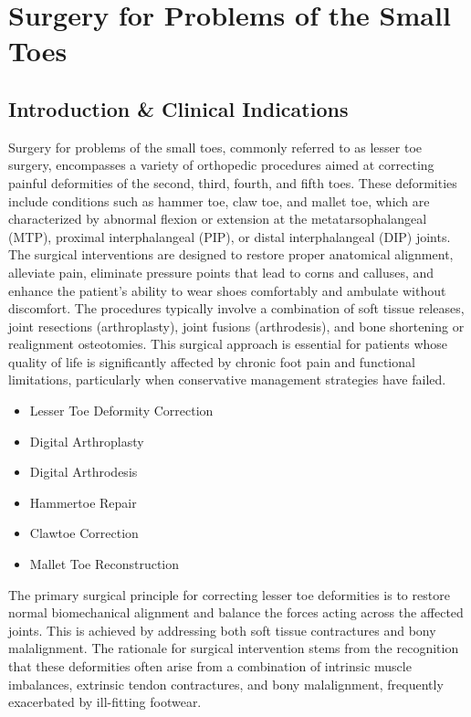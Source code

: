 \chapter{Surgery for Problems of the Small Toes}

\section*{Introduction \& Clinical Indications}
Surgery for problems of the small toes, commonly referred to as lesser toe surgery, encompasses a variety of orthopedic procedures aimed at correcting painful deformities of the second, third, fourth, and fifth toes. These deformities include conditions such as hammer toe, claw toe, and mallet toe, which are characterized by abnormal flexion or extension at the metatarsophalangeal (MTP), proximal interphalangeal (PIP), or distal interphalangeal (DIP) joints. The surgical interventions are designed to restore proper anatomical alignment, alleviate pain, eliminate pressure points that lead to corns and calluses, and enhance the patient's ability to wear shoes comfortably and ambulate without discomfort. The procedures typically involve a combination of soft tissue releases, joint resections (arthroplasty), joint fusions (arthrodesis), and bone shortening or realignment osteotomies. This surgical approach is essential for patients whose quality of life is significantly affected by chronic foot pain and functional limitations, particularly when conservative management strategies have failed.

\begin{itemize}
  \item Lesser Toe Deformity Correction
  \item Digital Arthroplasty
  \item Digital Arthrodesis
  \item Hammertoe Repair
  \item Clawtoe Correction
  \item Mallet Toe Reconstruction
\end{itemize}

The primary surgical principle for correcting lesser toe deformities is to restore normal biomechanical alignment and balance the forces acting across the affected joints. This is achieved by addressing both soft tissue contractures and bony malalignment. The rationale for surgical intervention stems from the recognition that these deformities often arise from a combination of intrinsic muscle imbalances, extrinsic tendon contractures, and bony malalignment, frequently exacerbated by ill-fitting footwear.

